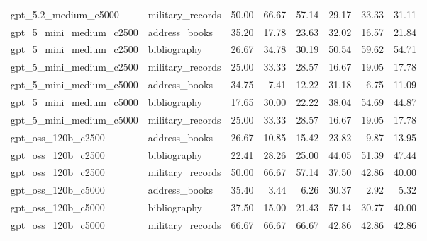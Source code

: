 \begin{table}
\begin{tabular}{llrrrrrr}
gpt_5.2_medium_c5000 & military_records & 50.00 & 66.67 & 57.14 & 29.17 & 33.33 & 31.11 \\
gpt_5_mini_medium_c2500 & address_books & 35.20 & 17.78 & 23.63 & 32.02 & 16.57 & 21.84 \\
gpt_5_mini_medium_c2500 & bibliography & 26.67 & 34.78 & 30.19 & 50.54 & 59.62 & 54.71 \\
gpt_5_mini_medium_c2500 & military_records & 25.00 & 33.33 & 28.57 & 16.67 & 19.05 & 17.78 \\
gpt_5_mini_medium_c5000 & address_books & 34.75 & 7.41 & 12.22 & 31.18 & 6.75 & 11.09 \\
gpt_5_mini_medium_c5000 & bibliography & 17.65 & 30.00 & 22.22 & 38.04 & 54.69 & 44.87 \\
gpt_5_mini_medium_c5000 & military_records & 25.00 & 33.33 & 28.57 & 16.67 & 19.05 & 17.78 \\
gpt_oss_120b_c2500 & address_books & 26.67 & 10.85 & 15.42 & 23.82 & 9.87 & 13.95 \\
gpt_oss_120b_c2500 & bibliography & 22.41 & 28.26 & 25.00 & 44.05 & 51.39 & 47.44 \\
gpt_oss_120b_c2500 & military_records & 50.00 & 66.67 & 57.14 & 37.50 & 42.86 & 40.00 \\
gpt_oss_120b_c5000 & address_books & 35.40 & 3.44 & 6.26 & 30.37 & 2.92 & 5.32 \\
gpt_oss_120b_c5000 & bibliography & 37.50 & 15.00 & 21.43 & 57.14 & 30.77 & 40.00 \\
gpt_oss_120b_c5000 & military_records & 66.67 & 66.67 & 66.67 & 42.86 & 42.86 & 42.86 \\
\bottomrule
\end{tabular}
\end{table}

